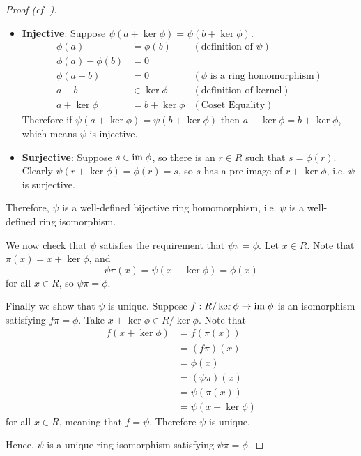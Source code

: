 \begin{proof}[Proof (cf. {\cite[p.~302, Factor Theorem For Rings]{cohn_1982}})]
\begin{itemize}
        \item \textbf{Injective}: Suppose $\psi(a+\ker\phi) = \psi(b+\ker\phi)$.
        \begin{align*}
            \phi(a) &= \phi(b) & (\text{definition of }\psi)\\
            \phi(a) - \phi(b) &= 0\\
            \phi(a-b) &= 0 & (\phi \text{ is a ring homomorphism})\\
            a - b &\in \ker\phi & (\text{definition of kernel})\\
            a + \ker\phi &= b + \ker\phi & (\text{Coset Equality})
        \end{align*}
        Therefore if $\psi(a+\ker\phi) = \psi(b+\ker\phi)$ then $a+\ker\phi = b+\ker\phi$, which means $\psi$ is injective.

        \item \textbf{Surjective}: Suppose $s \in \mathrm{im}\;\phi$, so there is an $r \in R$ such that $s = \phi(r)$. Clearly $\psi(r + \ker\phi) = \phi(r) = s$, so $s$ has a pre-image of $r + \ker\phi$, i.e. $\psi$ is surjective.
    \end{itemize}
    Therefore, $\psi$ is a well-defined bijective ring homomorphism, i.e. $\psi$ is a well-defined ring isomorphism.

    We now check that $\psi$ satisfies the requirement that $\psi\pi = \phi$. Let $x \in R$. Note that $\pi(x) = x + \ker\phi$, and
    \[
        \psi\pi(x) = \psi(x + \ker\phi) = \phi(x)
    \]
    for all $x \in R$, so $\psi\pi = \phi$.

    Finally we show that $\psi$ is unique. Suppose $f: R/\ker\phi \to \mathrm{im}\;\phi$ is an isomorphism satisfying $f\pi=\phi$. Take $x + \ker\phi \in R/\ker\phi$. Note that
    \begin{align*}
        f(x + \ker\phi) &= f(\pi(x))\\
        &= (f\pi)(x)\\
        &= \phi(x)\\
        &= (\psi\pi)(x)\\
        &= \psi(\pi(x))\\
        &= \psi(x + \ker\phi)
    \end{align*}
    for all $x \in R$, meaning that $f = \psi$. Therefore $\psi$ is unique.

    Hence, $\psi$ is a unique ring isomorphism satisfying $\psi\pi = \phi$.
\end{proof}


